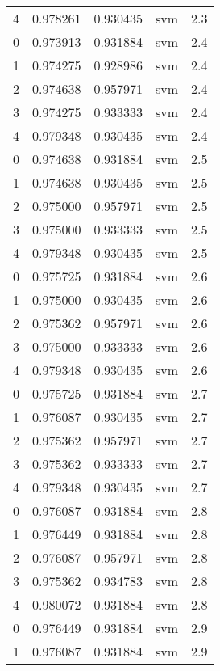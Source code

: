 \begin{tabular}{rrrlr}
     4 & 0.978261 & 0.930435 &      svm &        2.3 \\
     0 & 0.973913 & 0.931884 &      svm &        2.4 \\
     1 & 0.974275 & 0.928986 &      svm &        2.4 \\
     2 & 0.974638 & 0.957971 &      svm &        2.4 \\
     3 & 0.974275 & 0.933333 &      svm &        2.4 \\
     4 & 0.979348 & 0.930435 &      svm &        2.4 \\
     0 & 0.974638 & 0.931884 &      svm &        2.5 \\
     1 & 0.974638 & 0.930435 &      svm &        2.5 \\
     2 & 0.975000 & 0.957971 &      svm &        2.5 \\
     3 & 0.975000 & 0.933333 &      svm &        2.5 \\
     4 & 0.979348 & 0.930435 &      svm &        2.5 \\
     0 & 0.975725 & 0.931884 &      svm &        2.6 \\
     1 & 0.975000 & 0.930435 &      svm &        2.6 \\
     2 & 0.975362 & 0.957971 &      svm &        2.6 \\
     3 & 0.975000 & 0.933333 &      svm &        2.6 \\
     4 & 0.979348 & 0.930435 &      svm &        2.6 \\
     0 & 0.975725 & 0.931884 &      svm &        2.7 \\
     1 & 0.976087 & 0.930435 &      svm &        2.7 \\
     2 & 0.975362 & 0.957971 &      svm &        2.7 \\
     3 & 0.975362 & 0.933333 &      svm &        2.7 \\
     4 & 0.979348 & 0.930435 &      svm &        2.7 \\
     0 & 0.976087 & 0.931884 &      svm &        2.8 \\
     1 & 0.976449 & 0.931884 &      svm &        2.8 \\
     2 & 0.976087 & 0.957971 &      svm &        2.8 \\
     3 & 0.975362 & 0.934783 &      svm &        2.8 \\
     4 & 0.980072 & 0.931884 &      svm &        2.8 \\
     0 & 0.976449 & 0.931884 &      svm &        2.9 \\
     1 & 0.976087 & 0.931884 &      svm &        2.9 \\

\end{tabular}
